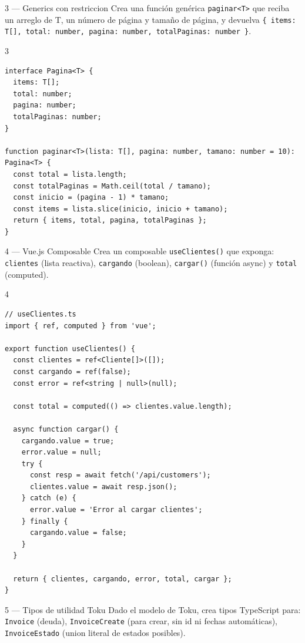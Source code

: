 \documentclass[11pt,a4paper]{article}
\begin{document}
\begin{ejerciciobox}{3 — Generics con restriccion}
Crea una función genérica \texttt{paginar<T>} que reciba un arreglo de T,
un número de página y tamaño de página, y devuelva
\texttt{\{ items: T[], total: number, pagina: number, totalPaginas: number \}}.
\end{ejerciciobox}

\begin{solucionbox}{3}
\begin{lstlisting}[style=typescript]
interface Pagina<T> {
  items: T[];
  total: number;
  pagina: number;
  totalPaginas: number;
}

function paginar<T>(lista: T[], pagina: number, tamano: number = 10): Pagina<T> {
  const total = lista.length;
  const totalPaginas = Math.ceil(total / tamano);
  const inicio = (pagina - 1) * tamano;
  const items = lista.slice(inicio, inicio + tamano);
  return { items, total, pagina, totalPaginas };
}
\end{lstlisting}
\end{solucionbox}

\begin{ejerciciobox}{4 — Vue.js Composable}
Crea un composable \texttt{useClientes()} que exponga:
\texttt{clientes} (lista reactiva), \texttt{cargando} (boolean),
\texttt{cargar()} (función async) y \texttt{total} (computed).
\end{ejerciciobox}

\begin{solucionbox}{4}
\begin{lstlisting}[style=typescript]
// useClientes.ts
import { ref, computed } from 'vue';

export function useClientes() {
  const clientes = ref<Cliente[]>([]);
  const cargando = ref(false);
  const error = ref<string | null>(null);

  const total = computed(() => clientes.value.length);

  async function cargar() {
    cargando.value = true;
    error.value = null;
    try {
      const resp = await fetch('/api/customers');
      clientes.value = await resp.json();
    } catch (e) {
      error.value = 'Error al cargar clientes';
    } finally {
      cargando.value = false;
    }
  }

  return { clientes, cargando, error, total, cargar };
}
\end{lstlisting}
\end{solucionbox}

\begin{ejerciciobox}{5 — Tipos de utilidad Toku}
Dado el modelo de Toku, crea tipos TypeScript para:
\texttt{Invoice} (deuda), \texttt{InvoiceCreate} (para crear, sin id ni fechas automáticas),
\texttt{InvoiceEstado} (union literal de estados posibles).
\end{ejerciciobox}
\end{document}
